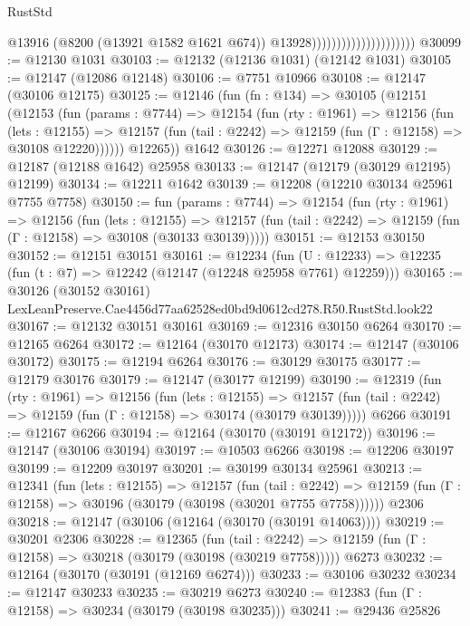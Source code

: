 \begin{lexlean}{RustStd}
\begin{coremodule}
                                              @13916
                                              (@8200 (@13921 @1582 @1621 @674))
                                              @13928)))))))))))))))))))))
@30099 := @12130 @1031
@30103 := @12132 (@12136 @1031) (@12142 @1031)
@30105 := @12147 (@12086 @12148)
@30106 := @7751 @10966
@30108 := @12147 (@30106 @12175)
@30125 := @12146
    (fun (fn : @134) =>
    @30105
      (@12151
        (@12153
          (fun (params : @7744) =>
          @12154
            (fun (rty : @1961) =>
            @12156
              (fun (lets : @12155) =>
              @12157 (fun (tail : @2242) => @12159 (fun (Γ : @12158) => @30108 @12220))))))
        @12265))
    @1642
@30126 := @12271 @12088
@30129 := @12187 (@12188 @1642) @25958
@30133 := @12147 (@12179 (@30129 @12195) @12199)
@30134 := @12211 @1642
@30139 := @12208 (@12210 @30134 @25961 @7755 @7758)
@30150 := fun (params : @7744) =>
  @12154
    (fun (rty : @1961) =>
    @12156
      (fun (lets : @12155) =>
      @12157 (fun (tail : @2242) => @12159 (fun (Γ : @12158) => @30108 (@30133 @30139)))))
@30151 := @12153 @30150
@30152 := @12151 @30151
@30161 := @12234
    (fun (U : @12233) => @12235 (fun (t : @7) => @12242 (@12147 (@12248 @25958 @7761) @12259)))
@30165 := @30126
    (@30152 @30161)
    LexLeanPreserve.Cae4456d77aa62528ed0bd9d0612cd278.R50.RustStd.look22
@30167 := @12132 @30151 @30161
@30169 := @12316 @30150 @6264
@30170 := @12165 @6264
@30172 := @12164 (@30170 @12173)
@30174 := @12147 (@30106 @30172)
@30175 := @12194 @6264
@30176 := @30129 @30175
@30177 := @12179 @30176
@30179 := @12147 (@30177 @12199)
@30190 := @12319
    (fun (rty : @1961) =>
    @12156
      (fun (lets : @12155) =>
      @12157 (fun (tail : @2242) => @12159 (fun (Γ : @12158) => @30174 (@30179 @30139)))))
    @6266
@30191 := @12167 @6266
@30194 := @12164 (@30170 (@30191 @12172))
@30196 := @12147 (@30106 @30194)
@30197 := @10503 @6266
@30198 := @12206 @30197
@30199 := @12209 @30197
@30201 := @30199 @30134 @25961
@30213 := @12341
    (fun (lets : @12155) =>
    @12157
      (fun (tail : @2242) =>
      @12159 (fun (Γ : @12158) => @30196 (@30179 (@30198 (@30201 @7755 @7758))))))
    @2306
@30218 := @12147 (@30106 (@12164 (@30170 (@30191 @14063))))
@30219 := @30201 @2306
@30228 := @12365
    (fun (tail : @2242) => @12159 (fun (Γ : @12158) => @30218 (@30179 (@30198 (@30219 @7758)))))
    @6273
@30232 := @12164 (@30170 (@30191 (@12169 @6274)))
@30233 := @30106 @30232
@30234 := @12147 @30233
@30235 := @30219 @6273
@30240 := @12383 (fun (Γ : @12158) => @30234 (@30179 (@30198 @30235)))
@30241 := @29436 @25826

\end{coremodule}
\end{lexlean}
